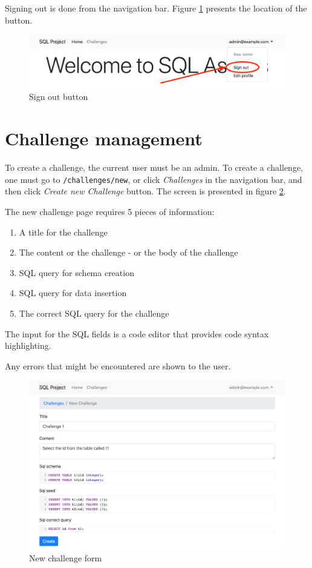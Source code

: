 Signing out is done from the navigation bar. Figure \ref{fig:app:signout} presents the location of the button.

\begin{figure}[ht]
    \centering
    \includegraphics[width=\textwidth/4*3]{Appendices/signout.png}
    \caption{Sign out button}
    \label{fig:app:signout}
\end{figure}

\section{Challenge management}
To create a challenge, the current user must be an admin. To create a challenge, one must go to \texttt{/challenges/new}, or click \textit{Challenges} in the navigation bar, and then click \textit{Create new Challenge} button. The screen is presented in figure \ref{fig:app:new_challenge}.

The new challenge page requires 5 pieces of information:
\begin{enumerate}
    \item A title for the challenge
    \item The content or the challenge - or the body of the challenge
    \item SQL query for schema creation
    \item SQL query for data insertion
    \item The correct SQL query for the challenge
\end{enumerate}

The input for the SQL fields is a code editor that provides code syntax highlighting.

Any errors that might be encountered are shown to the user.
\begin{figure}[ht]
    \centering
    \includegraphics[width=\textwidth/4*3]{Appendices/new_challenge.png}
    \caption{New challenge form}
    \label{fig:app:new_challenge}
\end{figure}

